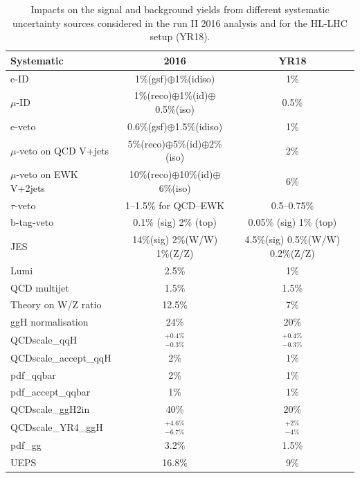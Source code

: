 \documentclass[../report.tex]{subfiles}
\begin{document}
\begin{table}[ht]
  \centering
  {%
  \begin{tabular}{l|c|c}
    \hline
    Systematic & 2016 & YR18 \\
    \hline
    e-ID & 1\%(gsf)$\oplus$1\%(idiso) & 1\% \\
    $\mu$-ID & 1\%(reco)$\oplus$1\%(id)$\oplus$0.5\%(iso) & 0.5\% \\
    \hline
    e-veto & 0.6\%(gsf)$\oplus$1.5\%(idiso) & 1\% \\
    $\mu$-veto on QCD V+jets & 5\%(reco)$\oplus$5\%(id)$\oplus$2\%(iso) & 2\% \\
    $\mu$-veto on EWK V+2jets & 10\%(reco)$\oplus$10\%(id)$\oplus$6\%(iso) & 6\% \\
    $\tau$-veto & 1--1.5\% for QCD--EWK  & 0.5--0.75\% \\
    b-tag-veto & 0.1\% (sig) 2\% (top) & 0.05\% (sig) 1\% (top) \\
    \hline
    JES & 14\%(sig) 2\%(W/W) 1\%(Z/Z) & 4.5\%(sig) 0.5\%(W/W) 0.2\%(Z/Z) \\
    Lumi & 2.5\% & 1\% \\
    QCD multijet & 1.5\%  & 1.5\% \\
    \hline
    Theory on W/Z ratio & 12.5\% & 7\% \\
    ggH normalisation & 24\% & 20\% \\
    QCDscale\_qqH & $^{+0.4\%}_{-0.3\%}$ & $^{+0.4\%}_{-0.3\%}$\\
    QCDscale\_accept\_qqH	& 2\% & 1\% \\
    pdf\_qqbar	        & 2\% & 1\% \\
    pdf\_accept\_qqbar	& 1\% & 1\% \\
    QCDscale\_ggH2in	& 40\%  & 20\% \\
    QCDscale\_YR4\_ggH & $^{+4.6\%}_{-6.7\%}$   & $^{+2\%}_{-4\%}$ \\
    pdf\_gg	&	3.2\%  & 1.5\% \\
    UEPS	&	16.8\% & 9\% \\
    \hline
\end{tabular}
    } \caption{Impacts on the signal and background yields from different systematic uncertainty sources considered in the run II 2016 analysis and
    for the HL-LHC setup (YR18).}  \label{tab:systs}
\end{table}
\end{document}
